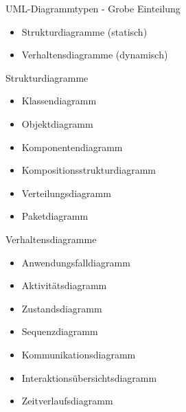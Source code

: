 \begin{frame}{UML-Diagrammtypen - Grobe Einteilung}
    \begin{itemize}
        \item Strukturdiagramme (statisch)
        \item Verhaltensdiagramme (dynamisch)
    \end{itemize}
\end{frame}

\begin{frame}{Strukturdiagramme}
    \begin{itemize}
            \item Klassendiagramm
            \item Objektdiagramm
            \item Komponentendiagramm
            \item Kompositionsstrukturdiagramm
            \item Verteilungsdiagramm
            \item Paketdiagramm
    \end{itemize}
\end{frame}

\begin{frame}{Verhaltensdiagramme}
    \begin{itemize}
        \item Anwendungsfalldiagramm
        \item Aktivitätsdiagramm
        \item Zustandsdiagramm
        \item Sequenzdiagramm
        \item Kommunikationsdiagramm
        \item Interaktionsübersichtsdiagramm
        \item Zeitverlaufsdiagramm
    \end{itemize}
\end{frame}